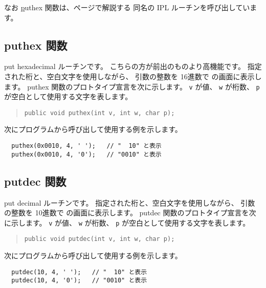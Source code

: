 なお \ul puthex 関数は、\pageref{app:ipl}ページで解説する
同名の IPL ルーチンを呼び出しています。

\subsection{puthex 関数}
put hexadecimal ルーチンです。
こちらの方が前出のものより高機能です。
指定された桁と、空白文字を使用しながら、
引数の整数を 16進数で \tac の画面に表示します。
puthex 関数のプロトタイプ宣言を次に示します。
\verb/v/ が値、
\verb/w/ が桁数、
\verb/p/ が空白として使用する文字を表します。

\begin{quote}
\begin{verbatim}
public void puthex(int v, int w, char p);
\end{verbatim}
\end{quote}

次に\cmml プログラムから呼び出して使用する例を示します。

\begin{mylist}
\begin{verbatim}
  puthex(0x0010, 4, ' ');   // "  10" と表示
  puthex(0x0010, 4, '0');   // "0010" と表示
\end{verbatim}
\end{mylist}


\subsection{putdec 関数}
put decimal ルーチンです。
指定された桁と、空白文字を使用しながら、
引数の整数を 10進数で \tac の画面に表示します。
putdec 関数のプロトタイプ宣言を次に示します。
\verb/v/ が値、
\verb/w/ が桁数、
\verb/p/ が空白として使用する文字を表します。

\begin{quote}
\begin{verbatim}
public void putdec(int v, int w, char p);
\end{verbatim}
\end{quote}

次に\cmml プログラムから呼び出して使用する例を示します。

\begin{mylist}
\begin{verbatim}
  putdec(10, 4, ' ');   // "  10" と表示
  putdec(10, 4, '0');   // "0010" と表示
\end{verbatim}
\end{mylist}

